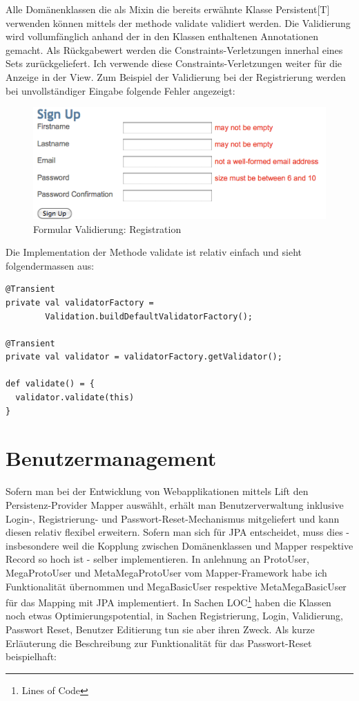 Alle Dom\"anenklassen die als Mixin die bereits erw\"ahnte Klasse Persistent[T] verwenden k\"onnen mittels der methode validate validiert werden. Die Validierung wird vollumf\"anglich anhand der in den Klassen enthaltenen Annotationen gemacht. Als R\"uckgabewert werden die Constraints-Verletzungen innerhal eines Sets zur\"uckgeliefert. Ich verwende diese Constraints-Verletzungen weiter f\"ur die Anzeige in der View. Zum Beispiel der Validierung bei der Registrierung werden bei unvollst\"andiger Eingabe folgende Fehler angezeigt:
 \begin{figure}[H]
  	\centering
    	\includegraphics[width=12cm]{images/validation_registration}
        	\caption{Formular Validierung: Registration}
\end{figure}


Die Implementation der Methode validate ist relativ einfach und sieht folgendermassen aus:
\begin{lstlisting}[caption=Validation innerhalb der Klasse Persistence]
@Transient
private val validatorFactory = 
		Validation.buildDefaultValidatorFactory();

@Transient
private val validator = validatorFactory.getValidator();
  
def validate() = {
  validator.validate(this)
}
\end{lstlisting}
\section{Benutzermanagement}
Sofern man bei der Entwicklung von Webapplikationen mittels Lift den Persistenz-Provider Mapper ausw\"ahlt, erh\"alt man Benutzerverwaltung inklusive Login-, Registrierung- und Passwort-Reset-Mechanismus mitgeliefert und kann diesen relativ flexibel erweitern. Sofern man sich f\"ur JPA entscheidet, muss dies - insbesondere weil die Kopplung zwischen Dom\"anenklassen und Mapper respektive Record so hoch ist - selber implementieren. In anlehnung an ProtoUser, MegaProtoUser und MetaMegaProtoUser vom Mapper-Framework habe ich Funktionalit\"at \"ubernommen und MegaBasicUser respektive MetaMegaBasicUser f\"ur das Mapping mit JPA implementiert. In Sachen LOC\footnote{Lines of Code} haben die Klassen noch etwas Optimierungspotential, in Sachen Registrierung, Login, Validierung, Passwort Reset, Benutzer Editierung tun sie aber ihren Zweck. Als kurze Erl\"auterung die Beschreibung zur Funktionalit\"at f\"ur das Passwort-Reset beispielhaft:


